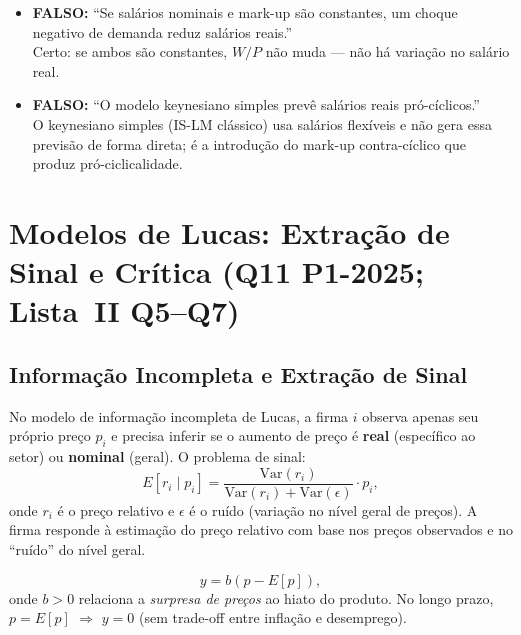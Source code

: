 \documentclass[12pt, a4paper]{article}
\begin{document}
\begin{armbox}[title={Armadilhas (Q8)}]
\begin{itemize}[leftmargin=*]
  \item \textbf{FALSO:} ``Se salários nominais e mark-up são constantes, um choque negativo de demanda reduz salários reais.'' \\ Certo: se ambos são constantes, $W/P$ não muda — não há variação no salário real.
  \item \textbf{FALSO:} ``O modelo keynesiano simples prevê salários reais pró-cíclicos.'' \\ O keynesiano simples (IS-LM clássico) usa salários flexíveis e não gera essa previsão de forma direta; é a introdução do mark-up contra-cíclico que produz pró-ciclicalidade.
\end{itemize}
\end{armbox}

\section{Modelos de Lucas: Extração de Sinal e Crítica (Q11 P1-2025; Lista~II Q5--Q7)}

\subsection{Informação Incompleta e Extração de Sinal}

No modelo de informação incompleta de Lucas, a firma $i$ observa apenas seu próprio preço $p_i$ e precisa inferir se o aumento de preço é \textbf{real} (específico ao setor) ou \textbf{nominal} (geral). O problema de sinal:
\[
  E[r_i \mid p_i] = \frac{\text{Var}(r_i)}{\text{Var}(r_i)+\text{Var}(\epsilon)}\cdot p_i,
\]
onde $r_i$ é o preço relativo e $\epsilon$ é o ruído (variação no nível geral de preços). A firma responde à estimação do preço relativo com base nos preços observados e no ``ruído'' do nível geral.

\begin{fatorbox}[title={Curva de Lucas (oferta agregada de Lucas)}]
\[
  y = b(p - E[p]),
\]
onde $b > 0$ relaciona a \emph{surpresa de preços} ao hiato do produto. No longo prazo, $p = E[p]$ $\Rightarrow$ $y = 0$ (sem trade-off entre inflação e desemprego).
\end{fatorbox}
\end{document}
